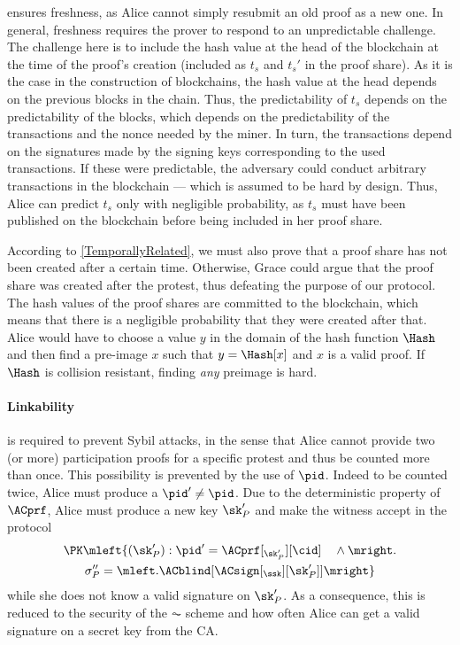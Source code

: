  ensures freshness, as Alice cannot simply resubmit an old proof as a new one.
In general, freshness requires the prover to respond to an unpredictable challenge.
The challenge here is to include the hash value at the head of the blockchain at the time of the proof's creation (included as \(t_s\) and \(t_s'\) in the proof share).
As it is the case in the construction of blockchains, the hash value at the head depends on the previous blocks in the chain.
Thus, the predictability of \(t_s\) depends on the predictability of the blocks, which depends on the predictability of the transactions and the nonce needed by the miner.
In turn, the transactions depend on the signatures made by the signing keys corresponding to the used transactions.
If these were predictable, the adversary could conduct arbitrary transactions in the blockchain --- which is assumed to be hard by design.
Thus, Alice can predict \(t_s\) only with negligible probability, as \(t_s\) must have been published on the blockchain before being included in her proof share.

According to \cref{TemporallyRelated}, we must also prove that a proof share has not been created after a certain time.
Otherwise, Grace could argue that the proof share was created after the protest, thus defeating the purpose of our protocol.
The hash values of the proof shares are committed to the blockchain, which means that there is a negligible probability that they were created after that.
Alice would have to choose a value \(y\) in the domain of the hash function \(\Hash\) and then find a pre-image \(x\) such that \(y = \Hash[x]\) and \(x\) is a valid proof.
If \(\Hash\) is collision resistant, finding \emph{any} preimage is hard.

\paragraph{Linkability}%
\label{analysis-linkability}

 is required to prevent Sybil attacks, in the sense
that Alice cannot provide two (or more) participation proofs for a
specific protest and thus be counted more than once.
This possibility is prevented by the use of \(\pid\).
Indeed to be counted twice, Alice must produce a \(\pid'\neq \pid\).
Due to the deterministic property of \(\ACprf\), Alice must produce a new key \(\sk_P'\) and make the witness accept in the protocol
\begin{multline*}
\PK\mleft\{ (\sk_P') : \pid' = \ACprf[_{\sk_P'}][\cid] \quad \land \mright. \\
    \sigma_P'' = \mleft. \ACblind[\ACsign[_{\ssk}][\sk_P']] \mright\}
\end{multline*}
while she does not know a valid signature on \(\sk_P'\).
As a consequence, this is reduced to the security of the \(\AC\) scheme and how often Alice can get a valid signature on a secret key from the \ac{CA}.


